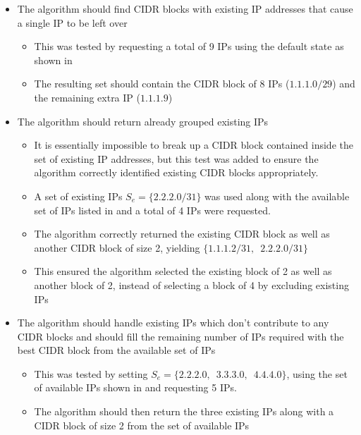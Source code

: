 \begin{itemize}
\begin{itemize}
      \end{itemize}
\item{The algorithm should find CIDR blocks with existing IP addresses that cause a single IP to be left over}
      \begin{itemize}
      \item{This was tested by requesting a total of 9 IPs using the default state as shown in }
      \item{The resulting set should contain the CIDR block of 8 IPs ($1.1.1.0/29$) and the remaining extra IP ($1.1.1.9$)}
      \end{itemize}
\item{The algorithm should return already grouped existing IPs}
      \begin{itemize}
      \item{It is essentially impossible to break up a CIDR block contained inside the set of existing IP addresses, but this test was added to ensure the algorithm correctly identified existing CIDR blocks appropriately.}
      \item{A set of existing IPs $S_e = \{2.2.2.0/31\}$ was used along with the available set of IPs listed in  and a total of 4 IPs were requested.}
      \item{The algorithm correctly returned the existing CIDR block as well as another CIDR block of size 2, yielding $\{1.1.1.2/31,\enspace2.2.2.0/31\}$}
      \item{This ensured the algorithm selected the existing block of 2 as well as another block of 2, instead of selecting a block of 4 by excluding existing IPs}
      \end{itemize}
\item{The algorithm should handle existing IPs which don't contribute to any CIDR blocks and should fill the remaining number of IPs required with the best CIDR block from the available set of IPs}
      \begin{itemize}
      \item{This was tested by setting $S_e = \{2.2.2.0,\enspace3.3.3.0,\enspace4.4.4.0\}$}, using the set of available IPs shown in  and requesting 5 IPs.
      \item{The algorithm should then return the three existing IPs along with a CIDR block of size 2 from the set of available IPs}
      \end{itemize}
\end{itemize}

